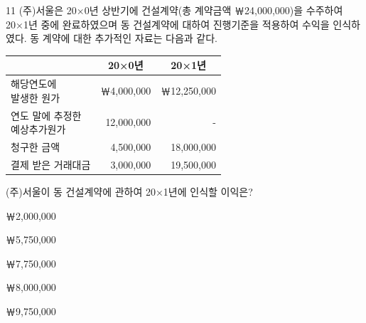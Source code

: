 \begin{question}{11}
(주)서울은 20×0년 상반기에 건설계약(총 계약금액 ￦24,000,000)을 수주하여 20×1년 중에 완료하였으며 동 건설계약에 대하여 진행기준을 적용하여 수익을 인식하였다. 동 계약에 대한 추가적인 자료는 다음과 같다.

{\small\centering
\begin{tabular}{|l|r|r|}
\hline
 & \multicolumn{1}{c|}{20×0년} & \multicolumn{1}{c|}{20×1년} \\
\hline
\makecell[l]{해당연도에\\발생한 원가} & ￦4,000,000 & ￦12,250,000 \\
\hline
\makecell[l]{연도 말에 추정한\\예상추가원가} & 12,000,000 & - \\
\hline
청구한 금액 & 4,500,000 & 18,000,000 \\
\hline
결제 받은 거래대금 & 3,000,000 & 19,500,000 \\
\hline
\end{tabular}\par}

(주)서울이 동 건설계약에 관하여 20×1년에 인식할 이익은? \par
\begin{choices}
  \item ￦2,000,000
  \item ￦5,750,000
  \item ￦7,750,000
  \item ￦8,000,000
  \item ￦9,750,000
\end{choices}
\end{question}
